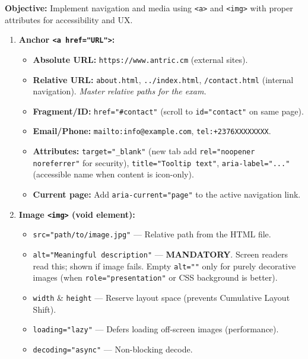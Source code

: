 \documentclass[11pt]{article}
\begin{document}
\begin{methode}
\textbf{Objective:} Implement navigation and media using \texttt{<a>} and \texttt{<img>} with proper attributes for accessibility and UX.
\begin{enumerate}
    \item \textbf{Anchor \texttt{<a href="URL">}:}
        \begin{itemize}
            \item \textbf{Absolute URL:} \texttt{https://www.antric.cm} (external sites).
            \item \textbf{Relative URL:} \texttt{about.html}, \texttt{../index.html}, \texttt{/contact.html} (internal navigation). \emph{Master relative paths for the exam.}
            \item \textbf{Fragment/ID:} \texttt{href="\#contact"} (scroll to \texttt{id="contact"} on same page).
            \item \textbf{Email/Phone:} \texttt{mailto:info@example.com}, \texttt{tel:+2376XXXXXXXX}.
            \item \textbf{Attributes:} \texttt{target="\_blank"} (new tab \textemdash add \texttt{rel="noopener noreferrer"} for security), \texttt{title="Tooltip text"}, \texttt{aria-label="..."} (accessible name when content is icon-only).
            \item \textbf{Current page:} Add \texttt{aria-current="page"} to the active navigation link.
        \end{itemize}
    \item \textbf{Image \texttt{<img>} (void element):}
        \begin{itemize}
            \item \texttt{src="path/to/image.jpg"} — Relative path from the HTML file.
            \item \texttt{alt="Meaningful description"} — \textbf{MANDATORY}. Screen readers read this; shown if image fails. Empty \texttt{alt=""} only for purely decorative images (when \texttt{role="presentation"} or CSS background is better).
            \item \texttt{width} \& \texttt{height} — Reserve layout space (prevents Cumulative Layout Shift).
            \item \texttt{loading="lazy"} — Defers loading off-screen images (performance).
            \item \texttt{decoding="async"} — Non-blocking decode.
        \end{itemize}

\end{enumerate}
\end{methode}
\end{document}
